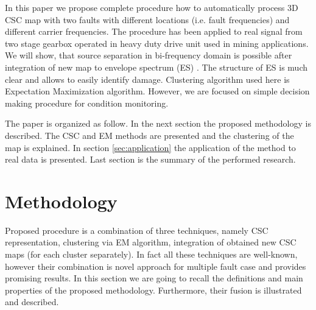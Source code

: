 \documentclass[11pt]{article}
\begin{document}
In this paper we propose complete procedure how to automatically process 3D CSC map with two faults with different locations (i.e. fault frequencies) and different carrier frequencies. The procedure has been applied to real signal from two stage gearbox operated in heavy duty drive unit used in mining applications. We will show, that source separation in bi-frequency domain is possible after integration of new map to envelope spectrum (ES) \cite{randall2001relationship}. The structure of ES is much clear and allows to easily identify damage. Clustering algorithm used here is Expectation Maximization \cite{dempster1977maximum, kaufman2009finding} algorithm. However, we are focused on simple decision making procedure for condition monitoring.  

The paper is organized as follow. In the next section the proposed methodology is described. The CSC and EM methods are presented and the  clustering of the map is explained. In section \ref{sec:application} the application of the method to real data is presented. Last section is the summary of the performed research.



\section{Methodology}
Proposed procedure is a combination of three techniques, namely CSC representation, clustering via EM algorithm, integration of obtained new CSC maps (for each cluster separately). In fact all these techniques are well-known, however their combination is novel approach for multiple fault case and provides promising results. In this section we are going to recall the  definitions and main properties of the proposed methodology. Furthermore, their fusion is illustrated and described. 
\end{document}
